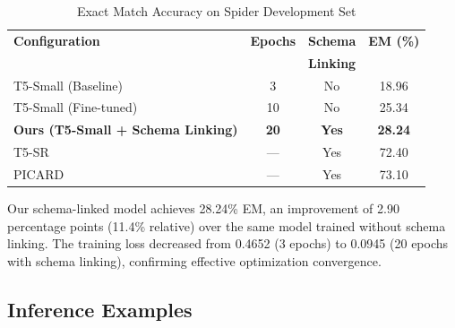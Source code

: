 \documentclass[conference]{IEEEtran}
\begin{document}
\begin{table}[htbp]
\caption{Exact Match Accuracy on Spider Development Set}
\begin{center}
\begin{tabular}{lccc}
\toprule
\textbf{Configuration} & \textbf{Epochs} & \textbf{Schema} & \textbf{EM (\%)} \\
                       &                 & \textbf{Linking} & \\
\midrule
T5-Small (Baseline)      & 3  & No  & 18.96 \\
T5-Small (Fine-tuned)    & 10 & No  & 25.34 \\
\textbf{Ours (T5-Small + Schema Linking)} & \textbf{20} & \textbf{Yes} & \textbf{28.24} \\
\midrule
T5-SR \cite{hui2022t5sr}   & — & Yes & 72.40 \\
PICARD \cite{scholak2021picard} & — & Yes & 73.10 \\
\bottomrule
\end{tabular}
\end{center}
\label{tab:results}
\end{table}

Our schema-linked model achieves 28.24\% EM, an improvement of 2.90 percentage points (11.4\% relative) over the same model trained without schema linking. The training loss decreased from 0.4652 (3 epochs) to 0.0945 (20 epochs with schema linking), confirming effective optimization convergence.

\subsection{Inference Examples}
\end{document}
